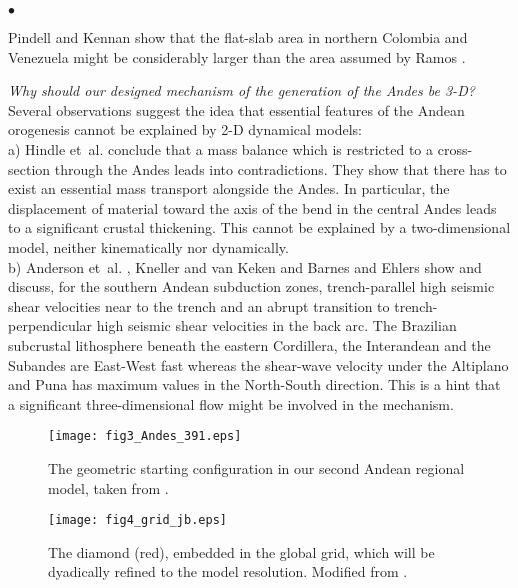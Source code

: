 \documentclass[twoside,10pt]{article}
\newenvironment{dlist}
   {\begin{list}
      {$\bullet$}
      {
      \setlength{\topsep}{0.5ex}
      \setlength{\partopsep}{0.0ex}
      \setlength{\parsep}{0.5ex}
      \setlength{\itemsep}{0.0ex}
      \setlength{\itemindent}{3.0ex}
      \setlength{\leftmargin}{0.0ex}
      \setlength{\labelsep}{1.0ex}
      }
   }
   {\end{list}}
\begin{document}
\begin{dlist}
Pindell and Kennan \cite{Pindell2009} show that the flat-slab area in northern Colombia and Venezuela might be considerably larger than the area assumed by Ramos \cite{Ramos2009}.
 \item \emph{Why should our designed mechanism of the generation of the Andes be 3-D?} 
Several observations suggest the idea that essential features of the Andean orogenesis cannot be explained by 2-D dynamical models:\\
a) Hindle et~al. \cite{Hindle2005} conclude that a mass balance which is restricted to a cross-section through the Andes leads into contradictions.
They show that there has to exist an essential mass transport alongside the Andes. 
In particular, the displacement of material toward the axis of the bend in the central Andes leads to a significant crustal thickening. 
This cannot be explained by a two-dimensional model, neither kinematically nor dynamically.\\
b) Anderson et~al. \cite{Anderson2004}, Kneller and van Keken \cite{Kneller2007} and Barnes and Ehlers \cite{Barnes2009} show and discuss, for the southern Andean subduction zones, trench-parallel high seismic shear velocities near to the trench and an abrupt transition to trench-perpendicular high seismic shear velocities in the back arc. 
The Brazilian subcrustal lithosphere beneath the eastern Cordillera, the Interandean and the Subandes are East-West fast whereas the shear-wave velocity under the Altiplano and Puna has maximum values in the North-South direction.
This is a hint that a significant three-dimensional flow might be involved in the mechanism.\\
\begin{figure}[htb!]
\begin{minipage}[b]{0.65\textwidth}
  \centering
  \texttt{[image: fig3\_Andes\_391.eps]}
  \caption{The geometric starting configuration in our second Andean regional model, taken from \cite{Vietor2006}.}
  \label{fig:3}
\end{minipage} 
\hspace{0.02\textwidth}
\begin{minipage}[b]{0.33\textwidth}
  \centering
  \texttt{[image: fig4\_grid\_jb.eps]}
  \caption{The diamond (red), embedded in the global grid, which will be dyadically refined to the model resolution. Modified from \cite[Fig. 1]{Baumgardner1985}.}

\end{minipage}
\end{figure}
\end{dlist}
\end{document}
